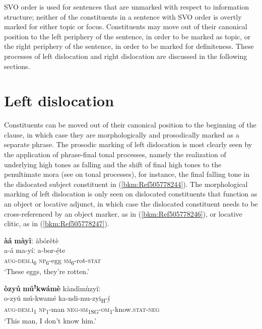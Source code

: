 SVO order is used for sentences that are unmarked with respect to information structure; neither of the constituents in a sentence with SVO order is overtly marked for either topic or focus. Constituents may move out of their canonical position to the left periphery of the sentence, in order to be marked as topic, or the right periphery of the sentence, in order to be marked for definiteness. These processes of left dislocation and right dislocation are discussed in the following sections.

\section{Left dislocation}
\label{bkm:Ref403656711}\hypertarget{Toc75352713}{}
Constituents can be moved out of their canonical position to the beginning of the clause, in which case they are morphologically and prosodically marked as a separate phrase. The prosodic marking of left dislocation is most clearly seen by the application of phrase-final tonal processes, namely the realization of underlying high tones as falling and the shift of final high tones to the penultimate mora (see  on tonal processes), for instance, the final falling tone in the dislocated subject constituent in (\ref{bkm:Ref505778244}). The morphological marking of left dislocation is only seen on dislocated constituents that function as an object or locative adjunct, in which case the dislocated constituent needs to be cross-referenced by an object marker, as in (\ref{bkm:Ref505778246}), or locative clitic, as in (\ref{bkm:Ref505778247}).

\ea
\label{bkm:Ref505778244}
\textbf{àá} \textbf{màyîː} àbórêtè\\
\gll a-á    ma-yíː    a-bor-é̲te\\
\textsc{aug}-\textsc{dem}.\textsc{i}\textsubscript{6}  \textsc{np}\textsubscript{6}-egg  \textsc{sm}\textsubscript{6}-rot-\textsc{stat}\\
\glt ‘These eggs, they’re rotten.’
\z

\ea
\label{bkm:Ref505778246}
\textbf{òzyú} \textbf{múꜝ}\textbf{kwámè} kàndìmùzyîː\\
\gll o-zyú    mú-kwamé  ka-ndi-mu-zyi\textsubscript{H}-í̲\\
\textsc{aug}-\textsc{dem}.\textsc{i}\textsubscript{1}  \textsc{np}\textsubscript{1}-man  \textsc{neg}-\textsc{sm}\textsubscript{1SG}-\textsc{om}\textsubscript{1}-know.\textsc{stat}-\textsc{neg}\\
\glt ‘This man, I don’t know him.’
\z

